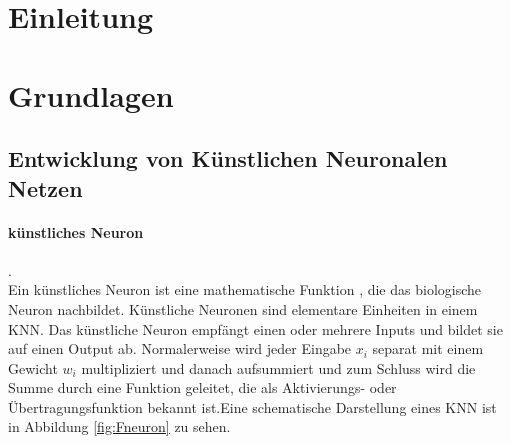 \documentclass[12pt,a4paper]{scrartcl}
\numberwithin{equation}{section}
\newcommand{\R}{\mathbb{R}} %
\begin{document}
  \tableofcontents
  \listoffigures

\newpage
 


  \pagestyle{headings}

\section{Einleitung}



 \newpage  %
 
\section{Grundlagen}
\subsection{Entwicklung von Künstlichen Neuronalen Netzen }

\paragraph{künstliches Neuron}.\\
Ein künstliches Neuron\cite{kneuron} ist eine mathematische Funktion
, die das biologische Neuron nachbildet. Künstliche Neuronen sind elementare Einheiten in einem \ac{KNN}. Das künstliche Neuron empfängt einen oder mehrere Inputs und bildet sie auf einen Output ab. Normalerweise wird jeder Eingabe $ x_i $ separat mit einem Gewicht $ w_i $ multipliziert und danach aufsummiert und zum Schluss wird die Summe durch eine Funktion geleitet, die als Aktivierungs- oder Übertragungsfunktion bekannt ist.Eine schematische Darstellung eines \ac{KNN} ist in Abbildung \ref{fig:Fneuron}
zu sehen.
\end{document}
